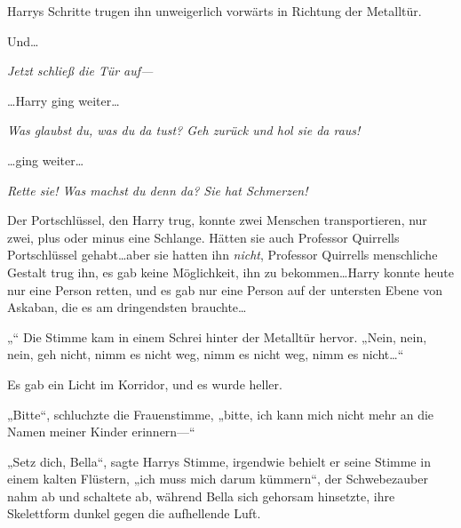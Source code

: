 Harrys Schritte trugen ihn unweigerlich vorwärts in Richtung der Metalltür.

Und…

\emph{Jetzt schließ die Tür auf—}

…Harry ging weiter…

\emph{Was glaubst du, was du da tust? Geh zurück und hol sie da raus!}

…ging weiter…

\emph{Rette sie! Was machst du denn da? Sie hat Schmerzen! }

Der Portschlüssel, den Harry trug, konnte zwei Menschen transportieren, nur zwei, plus oder minus eine Schlange. Hätten sie auch Professor Quirrells Portschlüssel gehabt…aber sie hatten ihn \emph{nicht}, Professor Quirrells menschliche Gestalt trug ihn, es gab keine Möglichkeit, ihn zu bekommen…Harry konnte heute nur eine Person retten, und es gab nur eine Person auf der untersten Ebene von Askaban, die es am dringendsten brauchte…

„“ Die Stimme kam in einem Schrei hinter der Metalltür hervor. „Nein, nein, nein, geh nicht, nimm es nicht weg, nimm es nicht weg, nimm es nicht…“

Es gab ein Licht im Korridor, und es wurde heller.

„Bitte“, schluchzte die Frauenstimme, „bitte, ich kann mich nicht mehr an die Namen meiner Kinder erinnern—“

„Setz dich, Bella“, sagte Harrys Stimme, irgendwie behielt er seine Stimme in einem kalten Flüstern, „ich muss mich darum kümmern“, der Schwebezauber nahm ab und schaltete ab, während Bella sich gehorsam hinsetzte, ihre Skelettform dunkel gegen die aufhellende Luft.

